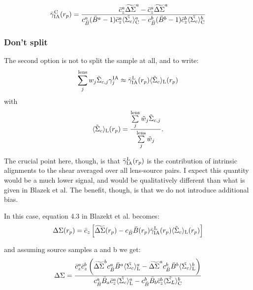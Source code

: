 \documentclass[onecolumn,amsmath,aps,fleqn, superscriptaddress]{revtex4}
\begin{document}
{\begin{equation}
\bar{\gamma}^{\rm C}_{\rm IA}(r_p) = \frac{\bar{c}_z^a \widetilde{\Delta\Sigma}^a - \bar{c}_z^a \widetilde{\Delta\Sigma}^a}{c_{\bar B}^a (\bar{B}^a-1)\bar{c}_z^a \langle \tilde{\Sigma_c}\rangle_{\rm C}^a - c_{\bar B}^b (\bar{B}^b-1)\bar{c}_z^b \langle \tilde{\Sigma_c}\rangle_{\rm C}^b}
\label{gamma_sol_splitLOS}
\end{equation}


\subsubsection*{Don't split}

The second option is not to split the sample at all, and to write:
\begin{equation}
\sum\limits_{j}^{\rm lens} w_j \tilde{\Sigma}_{c,j} \gamma^{\rm IA}_j \approx \bar{\gamma}^{\rm L}_{\rm IA}(r_p)\langle \tilde{\Sigma}_c\rangle_{\rm L} (r_p)
\label{nosplit}
\end{equation}
with 
\begin{equation}
\langle \tilde{\Sigma}_c\rangle_{\rm L} (r_p) = \frac{\sum\limits_{j}^{\rm lens} \tilde{w}_j \tilde{\Sigma}_{c,j}}{\sum\limits_{j}^{\rm lens} \tilde{w}_j}.
\label{Sigmalens}
\end{equation}

The crucial point here, though, is that $\bar{\gamma}^{\rm L}_{\rm IA}(r_p)$ is the contribution of intrinsic alignments to the shear averaged over all lens-source pairs. I expect this quantity would be a much lower signal, and would be qualitatively different than what is given in Blazek et al. The benefit, though, is that we do not introduce additional bias.

In this case, equation 4.3 in Blazekt et al. becomes:
\begin{equation}
\Delta \Sigma(r_p) = \bar{c}_z\left[\widetilde{\Delta \Sigma}(r_p) - c_{\bar B} \bar{B}(r_p) \bar{\gamma}_{\rm IA}^{\rm L}(r_p) \langle \tilde{\Sigma}_c\rangle_{\rm L} (r_p) \right]
\label{deltasigma_nosplit}
\end{equation}

and assuming source samples a and b we get:
\begin{equation}
\Delta\Sigma= \frac{\bar{c}_z^a \bar{c}_z^b\left(\widetilde{\Delta \Sigma}^bc_{\bar B}^a\bar{B}^a\langle \tilde{\Sigma_c}\rangle_{\rm L}^a - \widetilde{\Delta \Sigma}^ac_{\bar B}^b\bar{B}^b\langle \tilde{\Sigma_c}\rangle_{\rm L}^b\right)}{c_{\bar B}^a \bar{B}_a\bar{c}_z^a\langle \tilde{\Sigma_c} \rangle_{\rm L}^a - c_{\bar B}^b \bar{B}_b\bar{c}_z^b\langle \tilde{\Sigma_L} \rangle_{\rm C}^b}
\label{Deltasigma_sol_splitLOS}
\end{equation}

}
\end{document}
